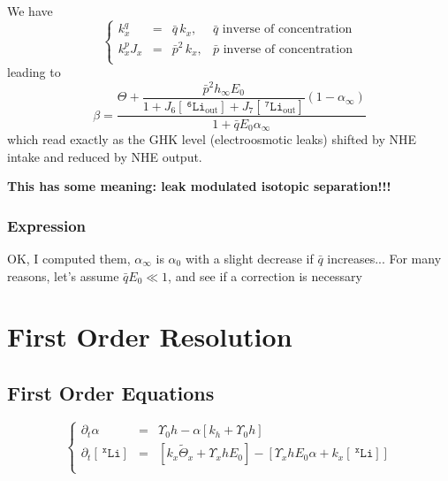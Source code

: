 \documentclass[aps,onecolumn,12pt]{revtex4}
\newcommand{\mychem}[1]{\mathtt{#1}}
\newcommand{\myconc}[1]{\left\lbrack{#1}\right\rbrack}
\newcommand{\spLi}[1]{{~^{\mychem{#1}}\mychem{Li}}}
\newcommand{\Li}[1]{\myconc{\spLi{#1}}}
\newcommand{\spLiOut}[1]{{\spLi{#1}}_{\mathrm{out}}}
\newcommand{\LiOut}[1]{\myconc{\spLiOut{#1}}}
\begin{document}
We have
\begin{equation}
\left\lbrace
	\begin{array}{rcll}
	k_x^q    & = & \bar{q}\,k_x,  &  \bar{q}\text{ inverse of concentration}\\
	k_x^pJ_x & = & \bar{p}^2\,k_x, & \bar{p}\text{ inverse of concentration}\\
	\end{array}
\right.
\end{equation}
leading to
\begin{equation}
	\label{steady_beta}
	\beta = \dfrac{\Theta+\dfrac{\bar{p}^2 h_\infty E_0}{1+J_6\LiOut{6}+J_7\LiOut{7}} \left(1-\alpha_\infty\right)}{1+\bar{q}E_0\alpha_\infty}
\end{equation}
which read exactly as the GHK level (electroosmotic leaks) shifted by NHE intake and reduced by NHE output.

\centerline{\bf This has some meaning: leak modulated isotopic separation!!!}

\subsubsection{Expression}
OK, I computed them, $\alpha_\infty$ is $\alpha_0$ with a slight decrease if $\bar{q}$ increases...
For many reasons, let's assume $\bar{q}E_0\ll 1$, and see if a correction is necessary

\section{First Order Resolution}

\subsection{First Order Equations}

\begin{equation}
\left\lbrace
\begin{array}{rcl}
\partial_t \alpha & = & \Upsilon_0 h - \alpha\left\lbrack k_h+\Upsilon_0 h  \right\rbrack\\
\partial_t\Li{x} & = & \left\lbrack k_x\tilde{\Theta}_x+\Upsilon_x h  E_0\right\rbrack
		-\left\lbrack
			\Upsilon_x h  E_0\alpha +  k_x\Li{x}  %
		\right\rbrack\\
\end{array}
\right.
\end{equation}
\end{document}
